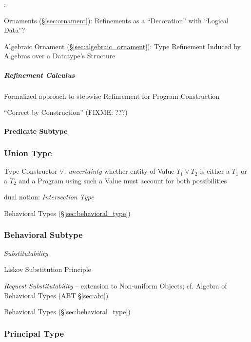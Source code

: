 \asterism


\cite{mcbride13}:

Ornaments (\S\ref{sec:ornament}): Refinements as a ``Decoration'' with
``Logical Data''? %

Algebraic Ornament (\S\ref{sec:algebraic_ornament}): Type Refinement
Induced by Algebras over a Datatype's Structure



\subparagraph{Refinement Calculus}\label{sec:refinement_calculus}\hfill

Formalized approach to stepwise Refinrement for Program Construction

``Correct by Construction'' (FIXME: ???)



\paragraph{Predicate Subtype}\label{sec:predicate_subtype}\hfill



\subsubsection{Union Type}\label{sec:union_type}

Type Constructor $\vee$: \emph{uncertainty} whether entity of Value
$T_1 \vee T_2$ is either a $T_1$ or a $T_2$ and a Program using such a
Value must account for both possibilities


dual notion: \emph{Intersection Type}

\fist Behavioral Types (\S\ref{sec:behavioral_type})



\subsubsection{Behavioral Subtype}\label{sec:behavioral_subtype}

\emph{Substitutability}

Liskov Substitution Principle

\emph{Request Substitutability} -- extension to Non-uniform Objects;
cf. Algebra of Behavioral Types (ABT \S\ref{sec:abt})

\fist Behavioral Types (\S\ref{sec:behavioral_type})



\subsubsection{Principal Type}\label{sec:principal_type}

